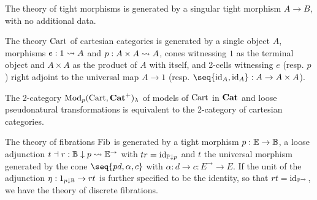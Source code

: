\documentclass[../thesis.tex]{subfiles}
\begin{document}
  \begin{example}
    The theory of tight morphisms is generated by a singular tight morphism $A \to B$, with no additional
    data.
  \end{example}

  \begin{example}
    The theory ${\mathrm{Cart}}$ of cartesian categories is generated by a single object $A$, morphisms
    $e : 1 \rightsquigarrow A$ and $p : A \times A \rightsquigarrow A$, cones witnessing $1$ as the terminal object
    and $A \times A$ as the product of $A$ with itself, and 2-cells witnessing $e$ (resp. $p$)
    right adjoint to the universal map $A \to 1$ (resp. $\seq{\id_A, \id_A} : A \to A \times A$).

    The 2-category ${\mathrm{Mod}}_p({\mathrm{Cart}},{\mathbf{Cat}}^+)_\lambda$ of models of ${\mathrm{Cart}}$ in ${\mathbf{Cat}}$ and loose pseudonatural
    transformations is equivalent to the 2-category of cartesian categories. 
  \end{example}
  \begin{example}\label{ex:fib}
    The theory of fibrations ${\mathrm{Fib}}$ is generated by a tight morphism $p : {\mathbb{E}} \to {\mathbb{B}}$, a loose adjunction $
    t \dashv r : {\mathbb{B}} \mathrel{\downarrow} p \rightsquigarrow {\mathbb{E}}^\to$ with $tr = {\mathrm{id}}_{{\mathbb{P}} \mathrel{\downarrow} p}$ and $t$ the universal morphism
    generated by the cone $\seq{p d, \alpha, c}$ with $\alpha : d \to c : E^\to \to E$. If the unit of the
    adjunction $\eta : 1_{p \mathrel{\downarrow} {\mathbb{B}}} \to rt$ is further specified to be the identity, so that $rt = \id_%
    {\bP^\to}$, we have the theory of discrete fibrations.
  \end{example}

  \ifSubfilesClassLoaded{\printbibliography}{}
\end{document}
